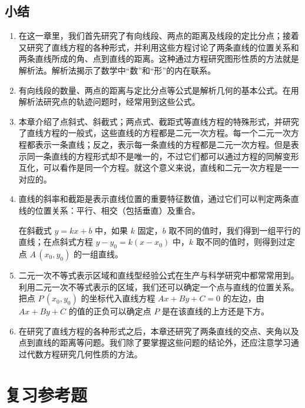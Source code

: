 \section*{小结}
\begin{enumerate}[C、,itemindent=4.5em]
  \item 在这一章里，我们首先研究了有向线段、两点的距离及线段的定比分点；接着又研究了直线方程的各种形式，并利用这些方程讨论了两条直线的位置关系和两条直线所成的角、点到直线的距离。这种通过方程研究图形性质的方法就是解析法。解析法揭示了数学中“数”和“形”的内在联系。
  \item 有向线段的数量、两点的距离与定比分点等公式是解析几何的基本公式。在用解析法研究点的轨迹问题时，经常用到这些公式。
  \item 本章介绍了点斜式、斜截式；两点式、截距式等直线方程的特殊形式，并研究了直线方程的一般式，这些直线的方程都是二元一次方程。每一个二元一次方程都表示一条直线；反之，表示每一条直线的方程都是二元一次方程。但是表示同一条直线的方程形式却不是唯一的，不过它们都可以通过方程的同解变形互化，可以看作是同一个方程。就这个意义来说，直线和二元一次方程是一一对应的。
  \item 直线的斜率和截距是表示直线位置的重要特征数值，通过它们可以判定两条直线的位置关系：平行、相交（包括垂直）及重合。
  
  在斜截式 $y=kx+b$ 中，如果 $k$ 固定，$b$ 取不同的值时，我们得到一组平行的直线；在点斜式方程 $y-y_0=k(x-x_0)$ 中，$k$ 取不同的值时，则得到过定点 $A\,(x_0,y_0)$ 的一组直线。
  \item 二元一次不等式表示区域和直线型经验公式在生产与科学研究中都常常用到。利用二元一次不等式表示的区域，我们还可以确定一个点与直线的位置关系。把点 $P\,(x_0,y_0)$ 的坐标代入直线方程 $Ax+By+C=0$ 的左边，由 $Ax+By+C$ 的值的正负可以确定点 $P$ 是在该直线的上方还是下方。
  \item 在研究了直线方程的各种形式之后，本章还研究了两条直线的交点、夹角以及点到直线的距离等问题。我们除了要掌握这些问题的结论外，还应注意学习通过代数方程研究几何性质的方法。
\end{enumerate}

\chapter*{复习参考题}
